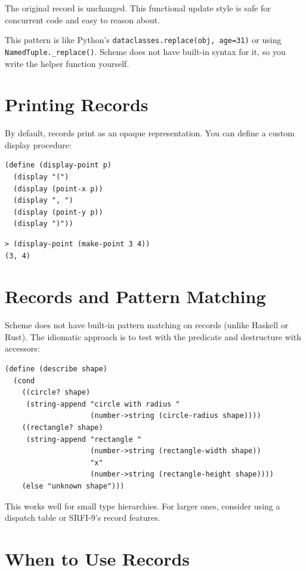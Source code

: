The original record is unchanged. This functional update style is safe for concurrent code and easy to reason about.

\begin{note}
This pattern is like Python's \texttt{dataclasses.replace(obj, age=31)} or using \texttt{NamedTuple.\_replace()}. Scheme does not have built-in syntax for it, so you write the helper function yourself.
\end{note}

\section{Printing Records}

By default, records print as an opaque representation. You can define a custom display procedure:

\begin{lstlisting}
(define (display-point p)
  (display "(")
  (display (point-x p))
  (display ", ")
  (display (point-y p))
  (display ")"))
\end{lstlisting}

\begin{lstlisting}[style=repl]
> (display-point (make-point 3 4))
(3, 4)
\end{lstlisting}

\section{Records and Pattern Matching}

Scheme does not have built-in pattern matching on records (unlike Haskell or Rust). The idiomatic approach is to test with the predicate and destructure with accessors:

\begin{lstlisting}
(define (describe shape)
  (cond
    ((circle? shape)
     (string-append "circle with radius "
                    (number->string (circle-radius shape))))
    ((rectangle? shape)
     (string-append "rectangle "
                    (number->string (rectangle-width shape))
                    "x"
                    (number->string (rectangle-height shape))))
    (else "unknown shape")))
\end{lstlisting}

This works well for small type hierarchies. For larger ones, consider using a dispatch table or SRFI-9's record features.

\section{When to Use Records}

